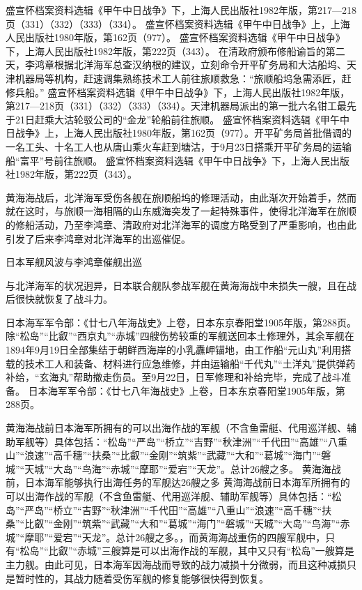 \documentclass[12pt,UTF8]{ctexbook}
\begin{document}
盛宣怀档案资料选辑《甲午中日战争》下，上海人民出版社1982年版，第217—218页（331）（332）（333）（334）。
盛宣怀档案资料选辑《甲午中日战争》上，上海人民出版社1980年版，第162页（977）。
盛宣怀档案资料选辑《甲午中日战争》下，上海人民出版社1982年版，第222页（343）。
在清政府颁布修船谕旨的第二天，李鸿章根据北洋海军总查汉纳根的建议，立刻命令开平矿务局和大沽船坞、天津机器局等机构，赶速调集熟练技术工人前往旅顺救急：“旅顺船坞急需添匠，赶修兵船。” 盛宣怀档案资料选辑《甲午中日战争》下，上海人民出版社1982年版，第217—218页（331）（332）（333）（334）。天津机器局派出的第一批六名钳工最先于21日赶乘大沽轮驳公司的“金龙”轮船前往旅顺。 盛宣怀档案资料选辑《甲午中日战争》上，上海人民出版社1980年版，第162页（977）。开平矿务局首批借调的一名工头、十名工人也从唐山乘火车赶到塘沽，于9月23日搭乘开平矿务局的运输船“富平”号前往旅顺。 盛宣怀档案资料选辑《甲午中日战争》下，上海人民出版社1982年版，第222页（343）。

黄海海战后，北洋海军受伤各舰在旅顺船坞的修理活动，由此渐次开始着手，然而就在这时，与旅顺一海相隔的山东威海突发了一起特殊事件，使得北洋海军在旅顺的修船活动，乃至李鸿章、清政府对北洋海军的调度方略受到了严重影响，也由此引发了后来李鸿章对北洋海军的出巡催促。

日本军舰风波与李鸿章催舰出巡

与北洋海军的状况迥异，日本联合舰队参战军舰在黄海海战中未损失一艘，且在战后很快就恢复了战斗力。

日本海军军令部：《廿七八年海战史》上卷，日本东京春阳堂1905年版，第288页。
除“松岛”“比叡”“西京丸”“赤城”四艘伤势较重的军舰送回本土修理外，其余军舰在1894年9月19日全部集结于朝鲜西海岸的小乳纛岬锚地，由工作船“元山丸”利用搭载的技术工人和装备、材料进行应急维修，并由运输船“千代丸”“土洋丸”提供弹药补给，“玄海丸”帮助撤走伤员。至9月22日，日军修理和补给完毕，完成了战斗准备。 日本海军军令部：《廿七八年海战史》上卷，日本东京春阳堂1905年版，第288页。

黄海海战前日本海军所拥有的可以出海作战的军舰（不含鱼雷艇、代用巡洋舰、辅助军舰等）具体包括：“松岛”“严岛”“桥立”“吉野”“秋津洲”“千代田”“高雄”“八重山”“浪速”“高千穗”“扶桑”“比叡”“金刚”“筑紫”“武藏”“大和”“葛城”“海门”“磐城”“天城”“大岛”“鸟海”“赤城”“摩耶”“爱宕”“天龙”。总计26艘之多。
黄海海战前，日本海军能够执行出海任务的军舰达26艘之多 黄海海战前日本海军所拥有的可以出海作战的军舰（不含鱼雷艇、代用巡洋舰、辅助军舰等）具体包括：“松岛”“严岛”“桥立”“吉野”“秋津洲”“千代田”“高雄”“八重山”“浪速”“高千穗”“扶桑”“比叡”“金刚”“筑紫”“武藏”“大和”“葛城”“海门”“磐城”“天城”“大岛”“鸟海”“赤城”“摩耶”“爱宕”“天龙”。总计26艘之多。，而黄海海战重伤的四艘军舰中，只有“松岛”“比叡”“赤城”三艘算是可以出海作战的军舰，其中又只有“松岛”一艘算是主力舰。由此可见，日本海军因海战而导致的战力减损十分微弱，而且这种减损只是暂时性的，其战力随着受伤军舰的修复能够很快得到恢复。
\end{document}
